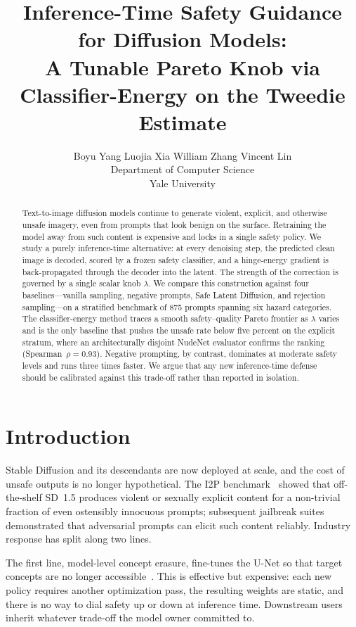 \documentclass{article}
\title{Inference-Time Safety Guidance for Diffusion Models:\\
A Tunable Pareto Knob via Classifier-Energy on the Tweedie Estimate}
\author{%
  Boyu Yang \quad Luojia Xia \quad William Zhang \quad Vincent Lin \\
  Department of Computer Science \\
  Yale University \\
}
\begin{document}
\maketitle

\begin{abstract}
Text-to-image diffusion models continue to generate violent, explicit, and otherwise unsafe imagery, even from prompts that look benign on the surface. Retraining the model away from such content is expensive and locks in a single safety policy. We study a purely inference-time alternative: at every denoising step, the predicted clean image is decoded, scored by a frozen safety classifier, and a hinge-energy gradient is back-propagated through the decoder into the latent. The strength of the correction is governed by a single scalar knob $\lambda$. We compare this construction against four baselines---vanilla sampling, negative prompts, Safe Latent Diffusion, and rejection sampling---on a stratified benchmark of 875 prompts spanning six hazard categories. The classifier-energy method traces a smooth safety--quality Pareto frontier as $\lambda$ varies and is the only baseline that pushes the unsafe rate below five percent on the explicit stratum, where an architecturally disjoint NudeNet evaluator confirms the ranking (Spearman~$\rho=0.93$). Negative prompting, by contrast, dominates at moderate safety levels and runs three times faster. We argue that any new inference-time defense should be calibrated against this trade-off rather than reported in isolation.
\end{abstract}

\section{Introduction}
\label{sec:intro}

Stable Diffusion and its descendants are now deployed at scale, and the cost of unsafe outputs is no longer hypothetical. The I2P benchmark~\citep{schramowski2023sld} showed that off-the-shelf SD~1.5 produces violent or sexually explicit content for a non-trivial fraction of even ostensibly innocuous prompts; subsequent jailbreak suites~\citep{yang2024mma,tsai2024ringabell} demonstrated that adversarial prompts can elicit such content reliably. Industry response has split along two lines.

The first line, model-level concept erasure, fine-tunes the U-Net so that target concepts are no longer accessible~\citep{gandikota2023esd,kumari2023ablation}. This is effective but expensive: each new policy requires another optimization pass, the resulting weights are static, and there is no way to dial safety up or down at inference time. Downstream users inherit whatever trade-off the model owner committed to.
\end{document}
